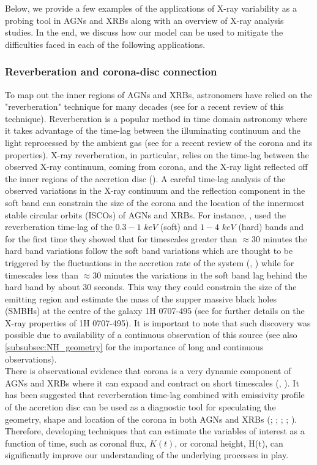 \documentclass{aa}
\begin{document}
Below, we provide a few examples of the applications of X-ray variability as a probing tool in AGNs and XRBs along with an overview of X-ray analysis studies. In the end, we discuss how our model can be used to mitigate the difficulties faced in each of the following applications. \\

\subsubsection{Reverberation and corona-disc connection}
To map out the inner regions of AGNs and XRBs, astronomers have relied on the "reverberation" technique for many decades (see \citealt{Cacket2021} for a recent review of this technique). Reverberation is a popular method in time domain astronomy where it takes advantage of the time-lag between the illuminating continuum and the light reprocessed by the ambient gas (see \citealt{Laha2025} for a recent review of the corona and its properties). X-ray reverberation, in particular, relies on the time-lag between the observed X-ray continuum, coming from corona, and the X-ray light reflected off the inner regions of the accretion disc (\citealt{Laha2025}). A careful time-lag analysis of the observed variations in the X-ray continuum and the reflection component in the soft band can constrain the size of the corona and the location of the innermost stable circular orbits (ISCOs) of AGNs and XRBs. For instance, \citet{Fabian2009}, used the reverberation time-lag of the $0.3-1$ $keV$ (soft) and $1-4$ $keV$ (hard) bands and for the first time they showed that for timescales greater than $\approx 30 $ minutes the hard band variations follow the soft band variations which are thought to be triggered by the fluctuations in the accretion rate of the system (\citealt{Hagen2024}, \citealt{Hagen2025}) while for timescales less than $\approx 30 $ minutes the variations in the soft band lag behind the hard band by about 30 seconds. This way they could constrain the size of the emitting region and estimate the mass of the supper massive black holes (SMBHs) at the centre of the galaxy 1H 0707-495 (see \citealt{Boller2002} for further details on the X-ray properties of 1H 0707-495). It is important to note that such discovery was possible due to availability of a continuous observation of this source (see also \ref{subsubsec:NH_geometry} for the importance of long and continuous observations). \\ 
There is observational evidence that corona is a very dynamic component of AGNs and XRBs where it can expand and contract on short timescales (\citealt{Cabanac2010}, \citealt{Shui2025}). It has been suggested that reverberation time-lag combined with emissivity profile of the accretion disc can be used as a diagnostic tool for speculating the geometry, shape and location of the corona in both AGNs and XRBs (\citealt{WilkinsFabian2011}; \citealt{WilkinsFabian2012}; \citealt{WilkinsFabian2013}; \citealt{WilkinsGallo2015}; \citealt{Gallo2018}). Therefore, developing techniques that can estimate the variables of interest as a function of time, such as coronal flux, $K(t)$, or coronal height, H(t), can significantly improve our understanding of the underlying processes in play. \\
\end{document}
